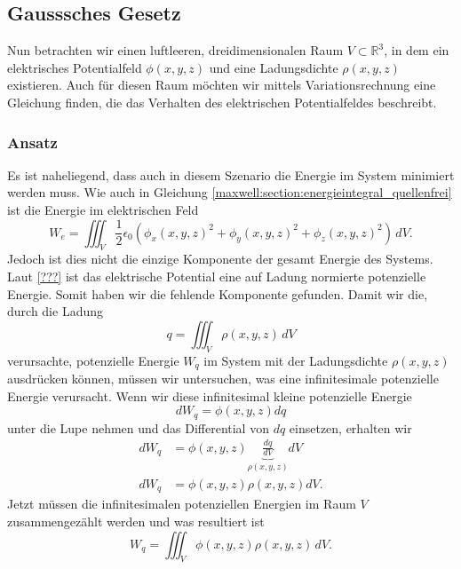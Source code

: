 %
%
%
%
\subsection{Gausssches Gesetz
\label{maxwell:section:elektrostatik_mit_quelle}}
Nun betrachten wir einen luftleeren, dreidimensionalen Raum $V\subset\mathbb{R}^3$, in dem ein elektrisches Potentialfeld $\phi(x,y,z)$ und eine Ladungsdichte $\rho(x,y,z)$ existieren.
Auch für diesen Raum möchten wir mittels Variationsrechnung eine Gleichung finden, die das Verhalten des elektrischen Potentialfeldes beschreibt.

\subsubsection{Ansatz}
Es ist naheliegend, dass auch in diesem Szenario die Energie im System minimiert werden muss.
Wie auch in Gleichung \eqref{maxwell:section:energieintegral_quellenfrei} ist die Energie im elektrischen Feld
\[
W_e
=
\iiint_V \frac{1}{2}\epsilon_0\left(\phi_x(x,y,z)^2 + \phi_y(x,y,z)^2 + \phi_z(x,y,z)^2\right)\, dV.
\]
Jedoch ist dies nicht die einzige Komponente der gesamt Energie des Systems.
Laut \ref{???} ist das elektrische Potential eine auf Ladung normierte potenzielle Energie.
Somit haben wir die fehlende Komponente gefunden.
Damit wir die, durch die Ladung
\[
q
=
\iiint_V \rho(x,y,z)\, dV
\]
verursachte, potenzielle Energie $W_q$ im System mit der Ladungsdichte $\rho(x,y,z)$ ausdrücken können, müssen wir untersuchen, was eine infinitesimale potenzielle Energie verursacht.
Wenn wir diese infinitesimal kleine potenzielle Energie
\[
dW_q
=
\phi(x,y,z)dq
\]
unter die Lupe nehmen und das Differential von $dq$ einsetzen, erhalten wir
\begin{align*}
dW_q
&=
\phi(x,y,z)\underbrace{\frac{dq}{dV}}_{\rho(x,y,z)}dV
\\
dW_q
&=
\phi(x,y,z)\rho(x,y,z)dV.
\end{align*}
Jetzt müssen die infinitesimalen potenziellen Energien im Raum $V$ zusammengezählt werden und was resultiert ist
\begin{equation}
W_q
=
\iiint_V \phi(x,y,z)\rho(x,y,z)\, dV.
\label{maxwell:section:potenzielle_energie_ladung}
\end{equation}
